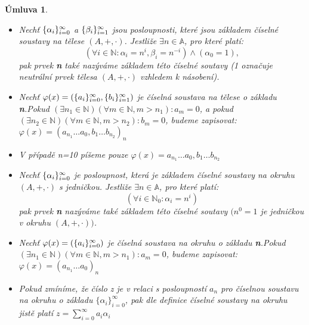 \documentclass[12pt]{book}
\newtheorem*{umluva}{Úmluva}
\begin{document}
\begin{umluva}\label{u1} \textbf \newline
	\begin{itemize}
		\item Nechť $\{\alpha_i\}_{i=0}^{\infty}$ a $\{\beta_i\}_{i=1}^{\infty}$  jsou posloupnosti, které jsou základem číselné soustavy na tělese $(A,+,\cdot)$. Jestliže $\exists n \in \mathbb{A}$, pro které platí:
		      $$ (\forall i \in \mathbb{N} : \alpha_i = n^i,\beta_i = n^{-i}) \land (\alpha_{0} = 1),$$
		      pak prvek \textbf{n} také nazýváme základem této číselné soutavy (1 označuje neutrální prvek tělesa $(A,+,\cdot)$ vzhledem k násobení).
		\item Nechť $\varphi(x) = (\{a_i\}_{i=0}^{\infty},\{b_i\}_{i=1}^{\infty})$ je číselná soustava na tělese o základu \textbf{n}.\newline Pokud $(\exists n_1 \in \mathbb{N}) (\forall m \in \mathbb{N},m>n_1):a_m = 0$, a pokud $(\exists n_2 \in \mathbb{N}) (\forall m \in \mathbb{N},m>n_2):b_m = 0$, budeme zapisovat: $\varphi(x) = (a_{n_1} \dots a_0,b_1 \dots b_{n_2})_n$
		\item V případě n=10 píšeme pouze $\varphi(x) = a_{n_1} \dots a_0,b_1 \dots b_{n_2}$
		\item Nechť $\{\alpha_i\}_{i=0}^{\infty}$ je posloupnost, která je základem číselné soustavy na okruhu $(A,+,\cdot)$ s jedničkou. Jestliže $\exists n \in \mathbb{A}$, pro které platí:
		      $$ (\forall i \in \mathbb{N}_0 : \alpha_i = n^i)$$
		      pak prvek \textbf{n} nazýváme také základem této číselné soutavy $(n^0=1$ je jedničkou v okruhu $(A,+,\cdot))$.
		\item Nechť $\varphi(x) = (\{a_i\}_{i=0}^{\infty})$ je číselná soustava na okruhu o základu \textbf{n}.\newline Pokud $(\exists n_1 \in \mathbb{N}) (\forall m \in \mathbb{N},m>n_1):a_m = 0$, budeme zapisovat: $\varphi(x) = (a_{n_1} \dots a_0)_n$
		\item Pokud zmíníme, že číslo z je v relaci s posloupností $a_n$ pro číselnou soustavu na okruhu o základu $\{\alpha_i\}_{i=0}^\infty$, pak dle definice číselné soustavy na okruhu jistě platí $z = \sum_{i=0}^{\infty} a_{i}\alpha_{i}$
	\end{itemize}
\end{umluva}
\end{document}

